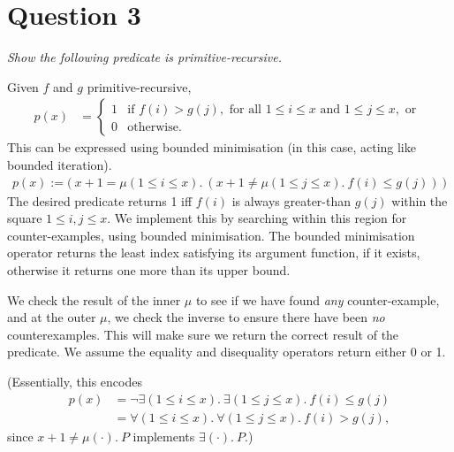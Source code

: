 \documentclass[a4paper]{article}
\begin{document}
\section*{Question 3}
\begin{center}
  \textit{Show the following predicate is primitive-recursive.}
\end{center}
Given $f$ and $g$ primitive-recursive,
\begin{align*}
  p(x) &= \begin{cases}
    1 & \text{if } f(i) > g(j),\text{ for all } 1 \le i \le x \text{ and } 1 \le j \le x,\text{ or } \\
    0 & \text{otherwise.}
  \end{cases}
\end{align*}
This can be expressed using bounded minimisation
(in this case, acting like bounded iteration).
\begin{align*}
  p(x) := \big(~x+1 = \mu(1\le i \le x).~(x+1 \ne \mu(1\le j \le x).~f(i) \le g(j))~\big)
\end{align*}
The desired predicate returns 1 iff $f(i)$ is always
greater-than $g(j)$ within
the square $1 \le i,j \le x$.
We implement this by searching within this region for counter-examples,
using bounded minimisation.
The bounded minimisation operator returns the least index satisfying its
argument function, if it exists, otherwise it returns one more than its upper bound.

We check the result of the inner $\mu$ to see if we have found \textit{any} counter-example,
and at the outer $\mu$, we check the inverse to ensure there have been \textit{no} counterexamples.
This will make sure we return the correct result of the predicate.
We assume the equality and disequality operators return either 0 or 1.

(Essentially, this encodes
\begin{align*}
  p(x) &= \neg \exists(1 \le i \le x).~\exists(1 \le j \le x).~f(i) \le g(j) \\
       &= \forall(1 \le i \le x).~\forall(1 \le j \le x).~f(i) > g(j),
\end{align*}
since $x + 1 \ne \mu(\cdot).~P$ implements $\exists(\cdot).~P$.)
\end{document}
